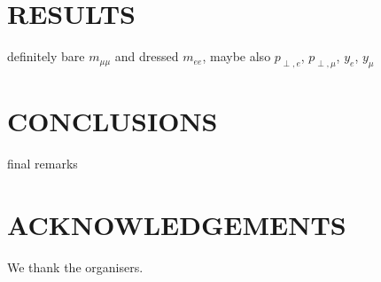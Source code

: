 \documentclass[11pt]{cernrep}
\begin{document}
\section{RESULTS}
\label{sec:dyew:results}

definitely bare $m_{\mu\mu}$ and dressed $m_{ee}$, 
maybe also $p_{\perp,e}$, $p_{\perp,\mu}$, $y_e$, $y_\mu$

\section{CONCLUSIONS}
\label{sec:dyew:conclusions}

final remarks

\section*{ACKNOWLEDGEMENTS}

We thank the organisers.


\end{document}
